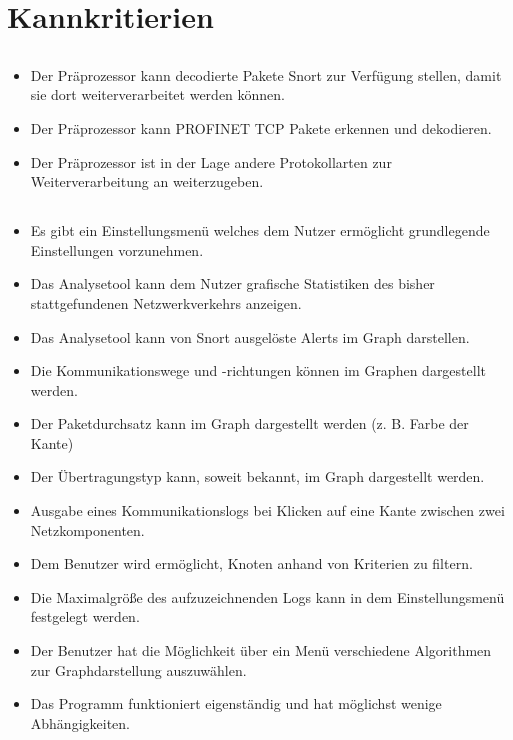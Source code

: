 \section{Kannkritierien}

\subsection{\sppname}

\begin{itemize}

\item Der Präprozessor kann decodierte Pakete Snort zur Verfügung stellen, damit sie dort weiterverarbeitet werden können.

\item Der Präprozessor kann PROFINET TCP Pakete erkennen und dekodieren.

\item Der Präprozessor ist in der Lage andere Protokollarten zur Weiterverarbeitung an \programname weiterzugeben.
\end{itemize}

\subsection{\programname}

\begin{itemize}
\item Es gibt ein Einstellungsmenü welches dem Nutzer ermöglicht grundlegende Einstellungen vorzunehmen.

\item Das Analysetool kann dem Nutzer grafische Statistiken des bisher stattgefundenen Netzwerkverkehrs anzeigen.

\item Das Analysetool kann von Snort ausgelöste Alerts im Graph darstellen.

\item Die Kommunikationswege und -richtungen können im Graphen dargestellt werden.

\item Der Paketdurchsatz kann im Graph dargestellt werden (z. B. Farbe der Kante)

\item Der Übertragungstyp kann, soweit bekannt, im Graph dargestellt werden.

\item Ausgabe eines Kommunikationslogs bei Klicken auf eine Kante zwischen zwei Netzkomponenten.

\item Dem Benutzer wird ermöglicht, Knoten anhand von Kriterien zu filtern.

\item Die Maximalgröße des aufzuzeichnenden Logs kann in dem Einstellungsmenü festgelegt werden.

\item Der Benutzer hat die Möglichkeit über ein Menü verschiedene Algorithmen zur Graphdarstellung auszuwählen.

\item Das Programm funktioniert eigenständig und hat möglichst wenige Abhängigkeiten.
\end{itemize}


